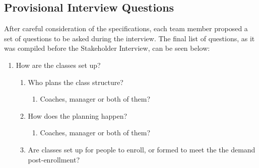 \documentclass{l3proj}
\begin{document}
\subsection{Provisional Interview Questions}
\par 

After careful consideration of the specifications, each team member proposed a set of questions to be asked during the interview. The final list of questions, as it was compiled before the Stakeholder Interview, can be seen below:

\begin{enumerate}
\item How are the classes set up?
		\begin{enumerate}
	\item Who plans the class structure?
			\begin{enumerate}
		\item Coaches, manager or both of them?
			\end{enumerate}
	\item How does the planning happen?
			\begin{enumerate}
		\item Coaches, manager or both of them?
			\end{enumerate}
	\item Are classes set up for people to enroll, or formed to meet the the demand post-enrollment?
\end{enumerate}


\end{enumerate}
\end{document}
